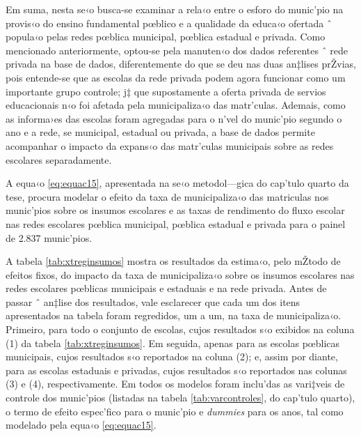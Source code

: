 \documentclass[a4paper, 12pt]{article}
\begin{document}
Em suma, nesta se‹o busca-se examinar a rela‹o entre o esforo do munic’pio na provis‹o do ensino fundamental pœblico e a qualidade da educa‹o ofertada ˆ popula‹o pelas redes pœblica municipal, pœblica estadual e privada. Como mencionado anteriormente, optou-se pela manuten‹o dos dados referentes ˆ rede privada na base de dados, diferentemente do que se deu nas duas an‡lises prŽvias, pois entende-se que as escolas da rede privada podem agora funcionar como um importante grupo controle; j‡ que supostamente a oferta privada de servios educacionais n‹o foi afetada pela municipaliza‹o das matr’culas. Ademais, como as informa›es das escolas foram agregadas para o n’vel do munic’pio segundo o ano e a rede, se municipal, estadual ou privada, a base de dados permite acompanhar o impacto da expans‹o das matr’culas municipais sobre as redes escolares separadamente. 

A equa‹o \ref{eq:equac15}, apresentada na se‹o metodol—gica do cap’tulo quarto da tese, procura modelar o efeito da taxa de municipaliza‹o das matriculas nos munic’pios sobre os insumos escolares e as taxas de rendimento do fluxo escolar nas redes escolares pœblica municipal, pœblica estadual e privada para o painel de 2.837 munic’pios. 



                             

A tabela \ref{tab:xtreginsumos} mostra os resultados da estima‹o, pelo mŽtodo de efeitos fixos, do impacto da taxa de municipaliza‹o sobre os insumos escolares nas redes escolares pœblicas municipais e estaduais e na rede privada. Antes de passar ˆ an‡lise dos resultados, vale esclarecer que cada um dos itens apresentados na tabela foram regredidos, um a um, na taxa de municipaliza‹o. Primeiro, para todo o conjunto de escolas, cujos resultados s‹o exibidos na coluna (1) da tabela \ref{tab:xtreginsumos}. Em seguida, apenas para as escolas pœblicas municipais, cujos resultados s‹o reportados na coluna (2); e, assim por diante, para as escolas estaduais e privadas, cujos resultados s‹o reportados nas colunas (3) e (4), respectivamente. Em todos os modelos foram inclu’das as vari‡veis de controle dos munic’pios (listadas na tabela \ref{tab:varcontroles}, do cap’tulo quarto), o termo de efeito espec’fico para o munic’pio e \emph{dummies} para os anos, tal como modelado pela equa‹o \ref{eq:equac15}.
\end{document}
